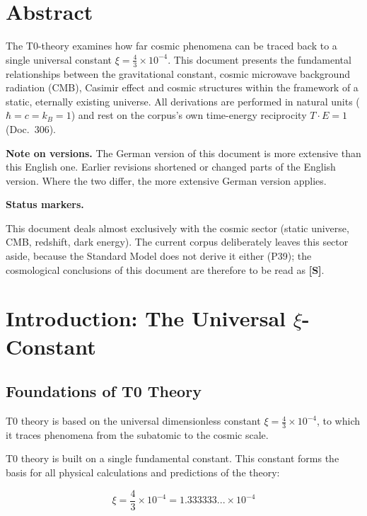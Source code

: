 \section*{Abstract}
		The T0-theory examines how far cosmic phenomena can be traced back to a single universal constant $\xi = \frac{4}{3} \times 10^{-4}$. This document presents the fundamental relationships between the gravitational constant, cosmic microwave background radiation (CMB), Casimir effect and cosmic structures within the framework of a static, eternally existing universe. All derivations are performed in natural units ($\hbar = c = k_B = 1$) and rest on the corpus's own time-energy reciprocity $T\cdot E = 1$ (Doc.~306).

	\medskip\noindent\textbf{Note on versions.} The German version of this document is more extensive than this English one. Earlier revisions shortened or changed parts of the English version. Where the two differ, the more extensive German version applies.


	\medskip\noindent\textbf{Status markers.}
	

	\noindent This document deals almost exclusively with the cosmic sector (static universe, CMB, redshift, dark energy). The current corpus deliberately leaves this sector aside, because the Standard Model does not derive it either (P39); the cosmological conclusions of this document are therefore to be read as \textbf{[S]}.

	

	\section{Introduction: The Universal $\xi$-Constant}
	
\subsection{Foundations of T0 Theory}

\begin{important}
	T0 theory is based on the universal dimensionless constant $\xi = \frac{4}{3} \times 10^{-4}$, to which it traces phenomena from the subatomic to the cosmic scale.
\end{important}

T0 theory is built on a single fundamental constant. This constant forms the basis for all physical calculations and predictions of the theory:

\begin{equation}
	\xi = \frac{4}{3} \times 10^{-4} = 1.333333... \times 10^{-4}
\end{equation}

